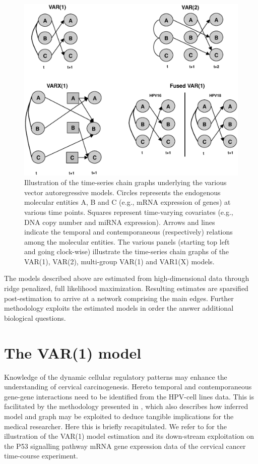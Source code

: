 \begin{compactitem}
\begin{figure}[h!]
\centering
\includegraphics[scale=0.6]{Figure_2.eps}
\caption{Illustration of the time-series chain graphs underlying the various vector autoregressive models. Circles represents the endogenous molecular entities A, B and C (e.g., mRNA expression of genes) at various time points. Squares represent time-varying covariates (e.g., DNA copy number and miRNA expression). Arrows and lines indicate the temporal and contemporaneous (respectively) relations among the molecular entities. The various panels (starting top left and going clock-wise) illustrate the time-series chain graphs of the VAR(1), VAR(2), multi-group VAR(1) and VAR1(X) models.}
\label{fig:VARmodels}  
\end{figure}
\end{compactitem}
The models described above are estimated from high-dimensional data through ridge penalized, full likelihood maximization. Resulting estimates are sparsified post-estimation to arrive at a network comprising the main edges. Further methodology exploits the estimated models in order the answer additional biological questions. 



\section{The VAR(1) model}
Knowledge of the dynamic cellular regulatory patterns may enhance the understanding of cervical carcinogenesis. Hereto temporal and contemporaneous gene-gene interactions need to be identified from the HPV-cell lines data. This is facilitated by the methodology presented in \cite{Miok2017}, which also describes how inferred model and graph may be exploited to deduce tangible implications for the medical researcher. Here this is briefly recapitulated. We  refer to \cite{Miok2017} for the illustration of the VAR(1) model estimation and its down-stream exploitation on the P53 signalling pathway mRNA gene expression data of the cervical cancer time-course experiment. 


